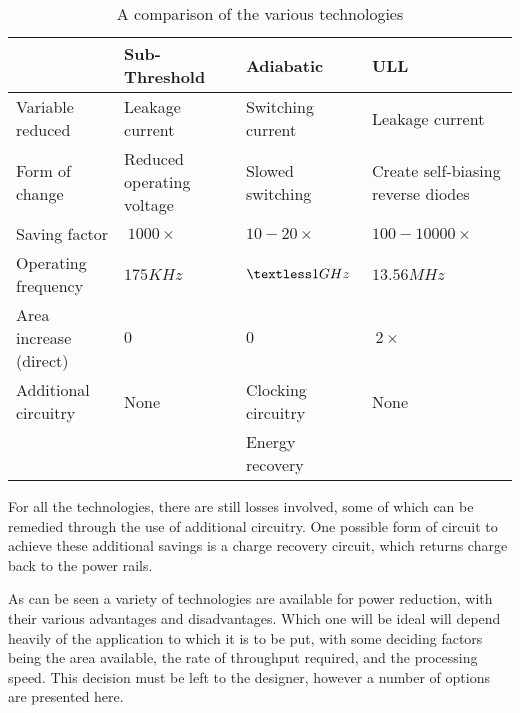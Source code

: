 \begin{table}[htbp]
	\begin{tabular}[width=\columnwidth]{| p{70px} | p{60px} | p{60px} | p{60px} |}
		\hline
					& Sub-Threshold			& Adiabatic		& ULL					\\
		\hline
		Variable reduced	& Leakage current		& Switching current	& Leakage current			\\
		Form of change		& Reduced operating voltage	& Slowed switching	& Create self-biasing reverse diodes	\\
		Saving factor 		& $~1000\times$			& $10-20\times$		& $100-10000\times$			\\
		Operating frequency	& $175KHz$			& $\textless 1GHz$	& $13.56MHz$				\\
		Area increase (direct)	& $0$				& $0$			& $~2\times$				\\
		Additional circuitry	& None				& Clocking circuitry	& None					\\
					& 				& Energy recovery	& 					\\
		\hline 
	\end{tabular}
	\caption{A comparison of the various technologies}
	\label{tab:comparison}
\end{table}

For all the technologies, there are still losses involved, some of which can be remedied through the use of additional circuitry.
One possible form of circuit to achieve these additional savings is a charge recovery circuit, which returns charge back to the power rails.

As can be seen a variety of technologies are available for power reduction, with their various advantages and disadvantages.
Which one will be ideal will depend heavily of the application to which it is to be put, with some deciding factors being the area available, the rate of throughput required, and the processing speed.
This decision must be left to the designer, however a number of options are presented here.
